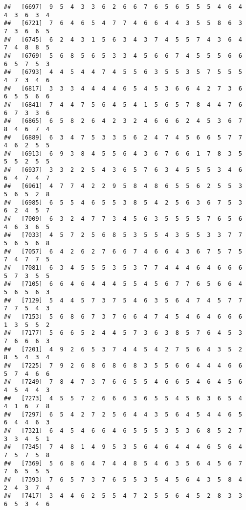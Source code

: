 \documentclass[
]{book}
\begin{document}
\begin{verbatim}
##   [6697]  9  5  4  3  3  6  2  6  6  7  6  5  6  5  5  5  4  6  4  4  3  6  3  4
##   [6721]  7  6  4  6  5  4  7  7  4  6  6  4  4  3  5  5  8  6  3  7  3  6  6  5
##   [6745]  6  2  4  3  1  5  6  3  4  3  7  4  5  5  7  4  3  6  4  7  4  8  8  5
##   [6769]  5  6  8  5  6  5  3  3  4  5  6  6  7  4  5  5  5  6  6  6  5  7  5  3
##   [6793]  4  4  5  4  4  7  4  5  5  6  3  5  5  3  5  7  5  5  5  4  7  3  4  6
##   [6817]  3  3  3  4  4  4  4  6  5  4  5  3  6  6  4  2  7  3  6  6  5  5  6  6
##   [6841]  7  4  4  7  5  6  4  5  4  1  5  6  5  7  8  4  4  7  6  6  7  3  3  6
##   [6865]  6  5  8  2  6  4  2  3  2  4  6  6  6  2  4  5  3  6  7  8  4  6  7  4
##   [6889]  6  3  4  7  5  3  3  5  6  2  4  7  4  5  6  6  5  7  7  4  6  2  5  5
##   [6913]  6  9  3  8  4  5  5  6  4  3  6  7  6  6  1  7  8  3  5  5  5  2  5  5
##   [6937]  3  3  2  2  5  4  3  6  5  7  6  3  4  5  5  5  3  4  6  6  4  7  4  7
##   [6961]  4  7  7  4  2  2  9  5  8  4  8  6  5  5  6  2  5  5  3  5  6  5  2  8
##   [6985]  6  5  5  4  6  5  5  3  8  5  4  2  5  6  3  6  7  5  3  6  2  4  5  7
##   [7009]  6  3  2  4  7  7  3  4  5  6  3  5  5  5  5  7  6  5  6  4  6  3  6  5
##   [7033]  4  5  7  2  5  6  8  5  3  5  5  4  3  5  5  3  3  7  7  5  6  5  6  8
##   [7057]  6  4  2  6  2  7  6  6  7  4  6  6  4  3  6  7  5  7  5  7  4  7  7  5
##   [7081]  6  3  4  5  5  5  3  5  3  7  7  4  4  4  6  4  6  6  6  5  7  3  5  5
##   [7105]  6  6  4  6  4  4  4  5  5  4  5  6  7  7  6  5  6  6  4  5  6  5  6  3
##   [7129]  5  4  4  5  7  3  7  5  4  6  3  5  6  4  7  4  5  7  7  7  7  5  4  3
##   [7153]  5  6  8  6  7  3  7  6  6  4  7  4  5  4  6  4  6  6  6  1  3  5  5  2
##   [7177]  5  6  6  5  2  4  4  5  7  3  6  3  8  5  7  6  4  5  3  7  6  6  6  3
##   [7201]  4  9  2  6  5  3  7  4  4  5  4  2  7  5  6  4  3  5  2  8  5  4  3  4
##   [7225]  7  9  2  6  8  6  8  6  8  3  5  5  6  6  4  4  4  6  6  5  7  4  6  6
##   [7249]  7  8  4  7  3  7  6  6  5  5  4  6  6  5  4  6  4  5  6  4  5  4  4  3
##   [7273]  4  5  5  7  2  6  6  6  3  6  5  5  4  5  6  3  6  5  4  4  1  6  7  8
##   [7297]  6  5  4  2  7  2  5  6  4  4  3  5  6  4  5  4  4  6  5  6  4  4  6  3
##   [7321]  6  4  5  4  6  6  4  6  5  5  5  3  5  3  6  8  5  2  7  3  3  4  5  1
##   [7345]  7  4  8  1  4  9  5  3  5  6  4  6  4  4  4  6  5  6  4  7  5  7  5  8
##   [7369]  5  6  8  6  4  7  4  4  8  5  4  6  3  5  6  4  5  6  7  7  6  5  5  5
##   [7393]  7  6  5  7  3  7  6  5  5  3  5  4  5  6  4  3  5  8  4  2  4  3  7  4
##   [7417]  3  4  4  6  2  5  5  4  7  2  5  5  6  4  5  2  8  3  3  6  5  3  4  6

\end{verbatim}
\end{document}
